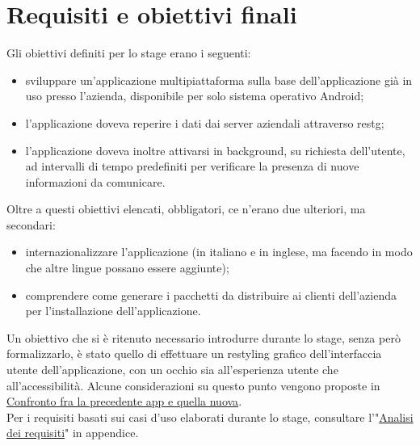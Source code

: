 \section{Requisiti e obiettivi finali}
\label{sec:requisiti-obiettivi-finali}

Gli obiettivi definiti per lo stage erano i seguenti:
\begin{itemize}
    \item sviluppare un'applicazione multipiattaforma sulla base dell'applicazione già in uso presso l'azienda, disponibile per solo sistema operativo Android;
    \item l'applicazione doveva reperire i dati dai server aziendali attraverso \gls{restg};
    \item l'applicazione doveva inoltre attivarsi in background, su richiesta dell'utente, ad intervalli di tempo predefiniti per verificare la presenza di nuove informazioni da comunicare.
\end{itemize}
Oltre a questi obiettivi elencati, obbligatori, ce n'erano due ulteriori, ma secondari:
\begin{itemize}
    \item internazionalizzare l'applicazione (in italiano e in inglese, ma facendo in modo che altre lingue possano essere aggiunte);
    \item comprendere come generare i pacchetti da distribuire ai clienti dell'azienda per l'installazione dell'applicazione.
\end{itemize}
Un obiettivo che si è ritenuto necessario introdurre durante lo stage, senza però formalizzarlo, è stato quello di effettuare un restyling grafico dell'interfaccia utente dell'applicazione, con un occhio sia all'esperienza utente che all'accessibilità. Alcune considerazioni su questo punto vengono proposte in \hyperref[sec:confronto-precedente-app-nuova]{Confronto fra la precedente app e quella nuova}.\\
Per i requisiti basati sui casi d'uso elaborati durante lo stage, consultare l'"\hyperref[cap:analisi-dei-requisiti]{Analisi dei requisiti}" in appendice.